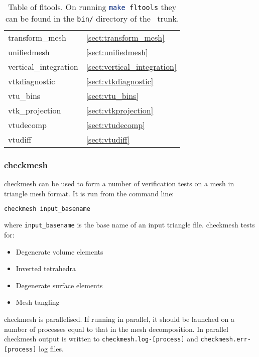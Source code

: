 \begin{table}
\begin{center}
\begin{tabular}{| l | l |}
	transform\_mesh				& \ref{sect:transform_mesh}		\\
	unifiedmesh				& \ref{sect:unifiedmesh} 		\\	
	vertical\_integration			& \ref{sect:vertical_integration} 	\\
	vtkdiagnostic				& \ref{sect:vtkdiagnostic}		\\
	vtu\_bins           			& \ref{sect:vtu_bins}			\\
	vtk\_projection				& \ref{sect:vtkprojection}		\\
	vtudecomp				& \ref{sect:vtudecomp}			\\
	vtudiff					& \ref{sect:vtudiff}			\\
    \hline
  \end{tabular}
\end{center}
\caption[Table of fltools]{Table of fltools. On running \lstinline[language = bash]+make fltools+ they can be found in the \lstinline[language = bash]+bin/+ directory of the \fluidity\ trunk.}
\label{tab:fltools}
\end{table}


\subsubsection{checkmesh}
\label{sect:checkmesh}
checkmesh can be used to form a number of verification tests on a mesh in triangle mesh
format. It is run from the command line:
\begin{lstlisting}[language = Bash]
checkmesh input_basename
\end{lstlisting}
where \lstinline[language = Bash]+input_basename+ is the base name of an input triangle file. checkmesh tests for:
\begin{itemize}
\item Degenerate volume elements
\item Inverted tetrahedra
\item Degenerate surface elements
\item Mesh tangling
\end{itemize}

checkmesh is parallelised. If running in parallel, it should be launched on a number of processes equal to that in the mesh decomposition. In parallel checkmesh output is written to
\lstinline[language = Bash]+checkmesh.log-[process]+ and \lstinline[language = Bash]+checkmesh.err-[process]+ log files.

